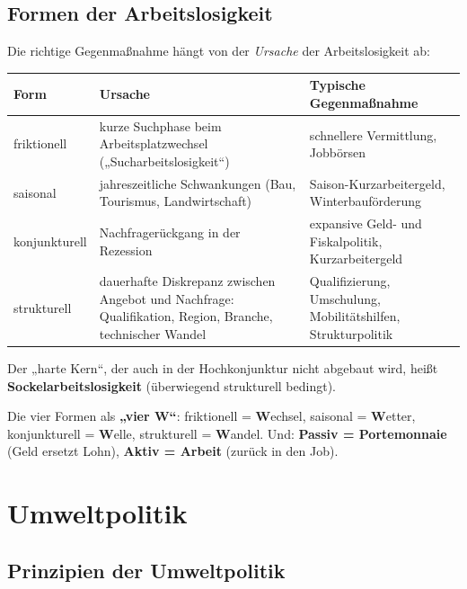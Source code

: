 \documentclass[11pt, a4paper]{article}
\begin{document}
\subsection{Formen der Arbeitslosigkeit}

Die richtige Gegenmaßnahme hängt von der \emph{Ursache} der Arbeitslosigkeit ab:

\begin{center}
\begin{tabular}{p{3.0cm} p{6.0cm} p{4.6cm}}
\toprule
\rowcolor{bfwTabHead}\textbf{Form} & \textbf{Ursache} & \textbf{Typische Gegenmaßnahme}\\
\midrule
friktionell & kurze Suchphase beim Arbeitsplatzwechsel („Sucharbeitslosigkeit``) & schnellere Vermittlung, Jobbörsen\\
saisonal & jahreszeitliche Schwankungen (Bau, Tourismus, Landwirtschaft) & Saison-Kurzarbeitergeld, Winterbauförderung\\
konjunkturell & Nachfragerückgang in der Rezession & expansive Geld- und Fiskalpolitik, Kurzarbeitergeld\\
strukturell & dauerhafte Diskrepanz zwischen Angebot und Nachfrage: Qualifikation, Region, Branche, technischer Wandel & Qualifizierung, Umschulung, Mobilitätshilfen, Strukturpolitik\\
\bottomrule
\end{tabular}
\end{center}

Der „harte Kern``, der auch in der Hochkonjunktur nicht abgebaut wird, heißt
\textbf{Sockelarbeitslosigkeit} (überwiegend strukturell bedingt).

\begin{eselsbruecke}
Die vier Formen als \textbf{„vier W``}: friktionell = \textbf{W}echsel, saisonal =
\textbf{W}etter, konjunkturell = \textbf{W}elle, strukturell = \textbf{W}andel.
Und: \textbf{Passiv = Portemonnaie} (Geld ersetzt Lohn), \textbf{Aktiv = Arbeit}
(zurück in den Job).
\end{eselsbruecke}

\section{Umweltpolitik}

\subsection{Prinzipien der Umweltpolitik}
\end{document}
